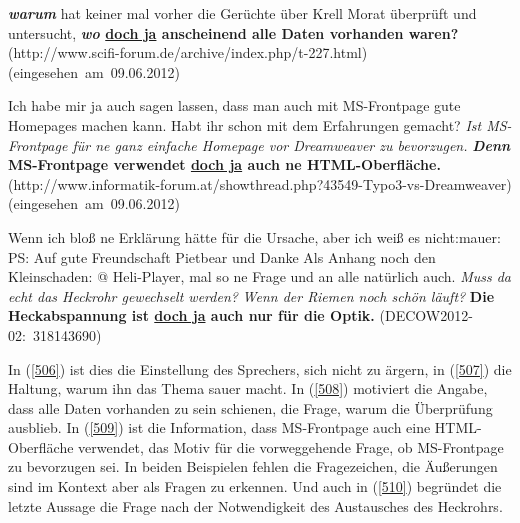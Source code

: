 \begin{exe}
	\ex\label{508} 
	\scriptsize
	\textbf{\emph{warum}} hat keiner mal vorher die Gerüchte über Krell Morat überprüft und untersucht, \textbf{\textit{wo} \underline{doch ja} 				anscheinend alle Daten vorhanden waren? }
	\newline
	\hbox{}\hfill\hbox{(http://www.scifi-forum.de/archive/index.php/t-227.html)}
	\newline
	\hbox{}\hfill\hbox{(eingesehen am 09.06.2012)}	
	\newline
	\hbox{}\hfill\hbox{\citet[203]{Mueller2014a}}	
\end{exe}	                 

\begin{exe}
	\ex\label{509} 
	\scriptsize
	Ich habe mir ja auch sagen lassen, dass man auch mit MS-Frontpage gute Homepages machen kann. Habt ihr schon mit dem Erfahrungen gemacht? 					\emph{Ist MS-Frontpage für ne ganz einfache Homepage vor Dreamweaver zu bevorzugen.} \textbf{\textit{Denn} MS-Frontpage verwendet 					\underline{doch ja} auch ne HTML-Oberfläche.}
	\newline
	\hbox{}\hfill\hbox{(http://www.informatik-forum.at/showthread.php?43549-Typo3-vs-Dreamweaver)}
	\newline
	\hbox{}\hfill\hbox{(eingesehen am 09.06.2012)}	
\end{exe}	                 

\begin{exe}
	\ex\label{510} 
	\scriptsize
	Wenn ich bloß ne Erklärung hätte für die Ursache, aber ich weiß es nicht:mauer: PS: Auf gute Freundschaft Pietbear und Danke Als Anhang noch den Kleinschaden: @ Heli-Player, mal so ne Frage und an alle natürlich auch. \emph{Muss da echt das Heckrohr gewechselt werden?} \emph{Wenn der Riemen noch schön läuft?} \textbf{Die Heckabspannung ist \underline{doch ja} auch nur für die Optik.}
	\hfill\hbox{(DECOW2012-02: 318143690)}
	\newline
	\hbox{}\hfill\hbox{\citet[230]{Mueller2017b}}	
\end{exe}	                 
In (\ref{506}) ist dies die Einstellung des Sprechers, sich nicht zu ärgern, in (\ref{507}) die Haltung, warum ihn das Thema sauer macht. In (\ref{508}) motiviert die Angabe, dass alle Daten vorhanden zu sein schienen, die Frage, warum die Überprüfung ausblieb. In (\ref{509}) ist die Information, dass MS-Frontpage auch eine HTML-Oberfläche verwendet, das Motiv für die vorweggehende Frage, ob MS-Frontpage zu bevorzugen sei. In beiden Beispielen fehlen die Fragezeichen, die Äußerungen sind im Kontext aber als Fragen zu erkennen. Und auch in (\ref{510}) begründet die letzte Aussage die Frage nach der Notwendigkeit des Austausches des Heckrohrs.


